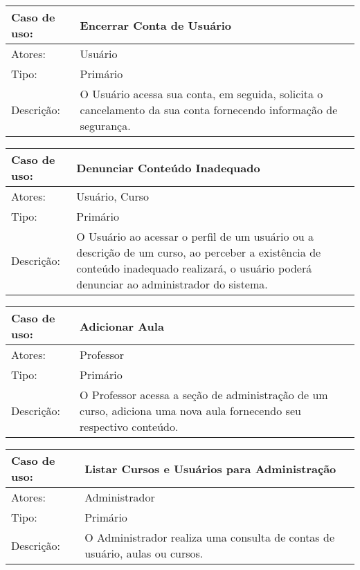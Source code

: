 \documentclass[12pt,a4paper,onecolumn,titlepage]{article}
\begin{document}
\begin{table}[h!]
\begin{center}
\begin{tabular}{p{2.5cm} p{9.5cm}}
Caso de uso: & \textbf{Encerrar Conta de Usuário} \\ \hline
Atores: & Usuário \\ \hline
Tipo: & Primário \\ \hline
Descrição: & O Usuário acessa sua conta, em seguida, solicita o cancelamento da sua conta fornecendo informação de segurança.

\end{tabular}
\end{center}
\end{table}


\begin{table}[h!]
\begin{center}
\begin{tabular}{p{2.5cm} p{9.5cm}}
Caso de uso: & \textbf{Denunciar Conteúdo Inadequado} \\ \hline
Atores: & Usuário, Curso \\ \hline
Tipo: & Primário \\ \hline
Descrição: & O Usuário ao acessar o perfil de um usuário ou a descrição de um curso, ao perceber a existência de conteúdo inadequado realizará, o usuário poderá denunciar ao administrador do sistema.

\end{tabular}
\end{center}
\end{table}

\begin{table}[h!]
\begin{center}
\begin{tabular}{p{2.5cm} p{9.5cm}}
Caso de uso: & \textbf{Adicionar Aula} \\ \hline
Atores: & Professor \\ \hline
Tipo: & Primário \\ \hline
Descrição: & O Professor acessa a seção de administração de um curso, adiciona uma nova aula fornecendo seu respectivo conteúdo.

\end{tabular}
\end{center}
\end{table}


\begin{table}[h!]
\begin{center}
\begin{tabular}{p{2.5cm} p{9.5cm}}
Caso de uso: & \textbf{Listar Cursos e Usuários para Administração} \\ \hline
Atores: & Administrador \\ \hline
Tipo: & Primário \\ \hline
Descrição: & O Administrador realiza uma consulta de contas de usuário, aulas ou cursos.

\end{tabular}
\end{center}
\end{table}
\end{document}
